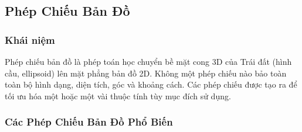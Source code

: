 \subsection{Phép Chiếu Bản Đồ}
\subsubsection{Khái niệm}
Phép chiếu bản đồ là phép toán học chuyển bề mặt cong 3D của Trái đất (hình cầu, ellipsoid) lên mặt phẳng bản đồ 2D. Không một phép chiếu nào bảo toàn toàn bộ hình dạng, diện tích, góc và khoảng cách. Các phép chiếu được tạo ra để tối ưu hóa một hoặc một vài thuộc tính tùy mục đích sử dụng.
\subsubsection{Các Phép Chiếu Bản Đồ Phổ Biến}
